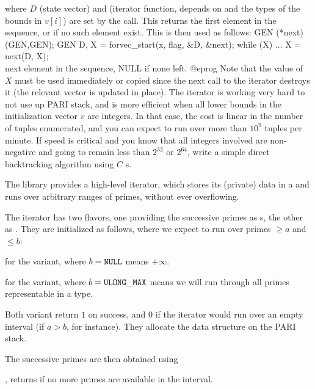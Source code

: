 where $D$ (state vector) and  (iterator function, depends
on  and the types of the bounds in $v[i]$) are set by the call.
This returns the first element in the  sequence, or  if
no such element exist. This is then used as follows:
\bprog
  GEN (*next)(GEN,GEN);
  GEN D, X = forvec_start(x, flag, &D, &next);
  while (X) {
    ...
    X = next(D, X);   \\ next element in the sequence, NULL if none left.
  }
@eprog\noindent
Note that the value of $X$ must be used immediately or copied since the next
call to the iterator destroys it (the relevant vector is updated in place).
The iterator is working very hard to not use up PARI stack, and is more
efficient when all lower bounds in the initialization vector $v$ are
integers. In that case, the cost is linear in the number of tuples
enumerated, and you can expect to run over more than $10^9$ tuples per
minute. If speed is critical and you know that all integers involved are
non-negative and going to remain less than $2^{32}$ or $2^{64}$, write a
simple direct backtracking algorithm using $C$ s.

\label{se:primeiter}

The library provides a high-level iterator, which stores its (private) data
in a   and runs over arbitrary ranges of primes,
without ever overflowing.

The iterator has two flavors, one providing the successive primes as
s, the other as . They are initialized as follows,
where we expect to run over primes $\geq a$ and $\leq b$:

 for the 
variant, where $b = {\tt NULL}$ means $+\infty$.

 for the
 variant, where $b = {\tt ULONG\_MAX}$ means we will run through
all primes representable in a  type.

Both variant return $1$ on success, and $0$ if the iterator would run over an
empty interval (if $a > b$, for instance). They allocate the 
data structure on the PARI stack.

\noindent The successive primes are then obtained using

, returns  if no more primes
are available in the interval.

